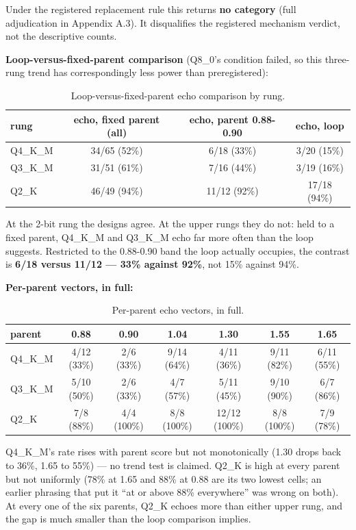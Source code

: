 Under the registered replacement rule this returns \textbf{no category} (full adjudication in Appendix A.3). It disqualifies the registered mechanism verdict, not the descriptive counts.

\textbf{Loop-versus-fixed-parent comparison} (Q8\_0's condition failed, so this three-rung trend has correspondingly less power than preregistered):

\begin{table}[htbp]
\centering
\caption{Loop-versus-fixed-parent echo comparison by rung.}
\begin{tabular}{lccc}
\toprule
rung & echo, fixed parent (all) & echo, parent 0.88-0.90 & echo, loop \\
\midrule
Q4\_K\_M & 34/65 (52\%) & 6/18 (33\%) & 3/20 (15\%) \\
Q3\_K\_M & 31/51 (61\%) & 7/16 (44\%) & 3/19 (16\%) \\
Q2\_K & 46/49 (94\%) & 11/12 (92\%) & 17/18 (94\%) \\
\bottomrule
\end{tabular}
\end{table}

At the 2-bit rung the designs agree. At the upper rungs they do not: held to a fixed parent, Q4\_K\_M and Q3\_K\_M echo far more often than the loop suggests. Restricted to the 0.88-0.90 band the loop actually occupies, the contrast is \textbf{6/18 versus 11/12 --- 33\% against 92\%}, not 15\% against 94\%.

\textbf{Per-parent vectors, in full:}

\begin{table}[htbp]
\centering
\caption{Per-parent echo vectors, in full.}
\footnotesize
\begin{tabular}{lcccccc}
\toprule
parent & 0.88 & 0.90 & 1.04 & 1.30 & 1.55 & 1.65 \\
\midrule
Q4\_K\_M & 4/12 (33\%) & 2/6 (33\%) & 9/14 (64\%) & 4/11 (36\%) & 9/11 (82\%) & 6/11 (55\%) \\
Q3\_K\_M & 5/10 (50\%) & 2/6 (33\%) & 4/7 (57\%) & 5/11 (45\%) & 9/10 (90\%) & 6/7 (86\%) \\
Q2\_K & 7/8 (88\%) & 4/4 (100\%) & 8/8 (100\%) & 12/12 (100\%) & 8/8 (100\%) & 7/9 (78\%) \\
\bottomrule
\end{tabular}
\end{table}

Q4\_K\_M's rate rises with parent score but not monotonically (1.30 drops back to 36\%, 1.65 to 55\%) --- no trend test is claimed. Q2\_K is high at every parent but not uniformly (78\% at 1.65 and 88\% at 0.88 are its two lowest cells; an earlier phrasing that put it ``at or above 88\% everywhere'' was wrong on both). At every one of the six parents, Q2\_K echoes more than either upper rung, and the gap is much smaller than the loop comparison implies.

